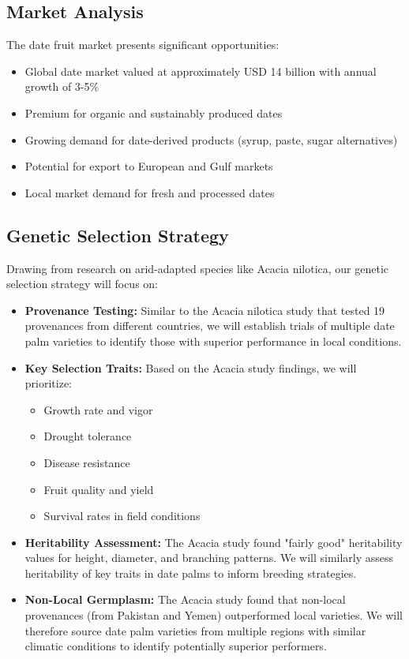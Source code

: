 \subsection{Market Analysis}
The date fruit market presents significant opportunities:
\begin{itemize}
    \item Global date market valued at approximately USD 14 billion with annual growth of 3-5\%
    \item Premium for organic and sustainably produced dates
    \item Growing demand for date-derived products (syrup, paste, sugar alternatives)
    \item Potential for export to European and Gulf markets
    \item Local market demand for fresh and processed dates
\end{itemize}

\subsection{Genetic Selection Strategy}
Drawing from research on arid-adapted species like Acacia nilotica, our genetic selection strategy will focus on:

\begin{itemize}
    \item \textbf{Provenance Testing:} Similar to the Acacia nilotica study that tested 19 provenances from different countries, we will establish trials of multiple date palm varieties to identify those with superior performance in local conditions.
    
    \item \textbf{Key Selection Traits:} Based on the Acacia study findings, we will prioritize:
    \begin{itemize}
        \item Growth rate and vigor
        \item Drought tolerance
        \item Disease resistance
        \item Fruit quality and yield
        \item Survival rates in field conditions
    \end{itemize}
    
    \item \textbf{Heritability Assessment:} The Acacia study found "fairly good" heritability values for height, diameter, and branching patterns. We will similarly assess heritability of key traits in date palms to inform breeding strategies.
    
    \item \textbf{Non-Local Germplasm:} The Acacia study found that non-local provenances (from Pakistan and Yemen) outperformed local varieties. We will therefore source date palm varieties from multiple regions with similar climatic conditions to identify potentially superior performers.
\end{itemize}

